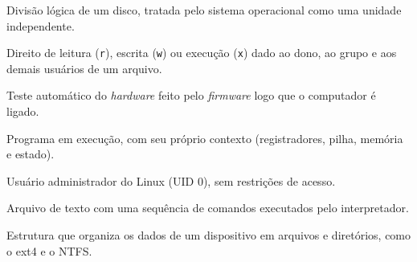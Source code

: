 \documentclass[12pt, a4paper, oneside, openany, chapter=TITLE, subsection=TITLE, section=TITLE, subsubsection=TITLE, subsubsubsection=TITLE, english, german, brazil]{abntex2}
\begin{document}
\begin{description}[style=nextline, leftmargin=1cm]
    \item[Partição] Divisão lógica de um disco, tratada pelo sistema operacional como uma unidade independente.
    \item[Permissão] Direito de leitura (\texttt{r}), escrita (\texttt{w}) ou execução (\texttt{x}) dado ao dono, ao grupo e aos demais usuários de um arquivo.
    \item[POST] Teste automático do \textit{hardware} feito pelo \textit{firmware} logo que o computador é ligado.
    \item[Processo] Programa em execução, com seu próprio contexto (registradores, pilha, memória e estado).
    \item[\textit{Root}] Usuário administrador do Linux (UID 0), sem restrições de acesso.
    \item[\textit{Script}] Arquivo de texto com uma sequência de comandos executados pelo interpretador.
    \item[Sistema de arquivos] Estrutura que organiza os dados de um dispositivo em arquivos e diretórios, como o ext4 e o NTFS.
\end{description}
\end{document}
